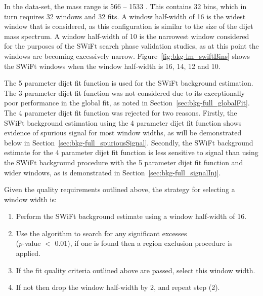 
In the \lm{} data-set, the mass range is 566 -- 1533 \GeV{}. This contains 32 bins, which in turn requires 32 windows and 32 fits.
A window half-width of 16 is  the widest window that is considered,
as this configuration is similar to the size of the dijet mass spectrum.
A window half-width of 10 is the narrowest window considered for the purposes of the SWiFt search phase validation studies,
as at this point the windows are becoming excessively narrow.
Figure~\ref{fig:bkg-lm_swiftBins} shows the SWiFt windows when the window half-width is 16, 14, 12 and 10.

The 5 parameter dijet fit function is used for the SWiFt background estimation.
The 3 parameter dijet fit function was not considered due to its exceptionally poor performance in the global fit, as noted in Section~\ref{sec:bkg-full_globalFit}.
The 4 parameter dijet fit function was rejected for two reasons.
Firstly, the SWiFt background estimation using the 4 parameter dijet fit function shows evidence of spurious signal for most window widths,
as will be demonstrated below in Section~\ref{sec:bkg-full_spuriousSignal}.
Secondly, the SWiFt background estimate for the 4 parameter dijet fit function is less sensitive to signal than
using the SWiFt background procedure with the 5 parameter dijet fit function and wider windows, as is demonstrated in Section~\ref{sec:bkg-full_signalInj}.

\newpage
\noindent
Given the quality requirements outlined above, the strategy for selecting a window width is:

\begin{enumerate}
\vspace{-0.5em}
\item Perform the SWiFt background estimate using a window half-width of 16.
\item Use the \bh{} algorithm to search for any significant excesses\\
  (\mbox{$p$-value} $<$ 0.01),  if one is found then a region exclusion procedure is applied.
\item If the fit quality criteria outlined above are passed, select this window width.
\item If not then drop the window half-width by 2, and repeat step (2).
\vspace{-0.5em}
\end{enumerate}

